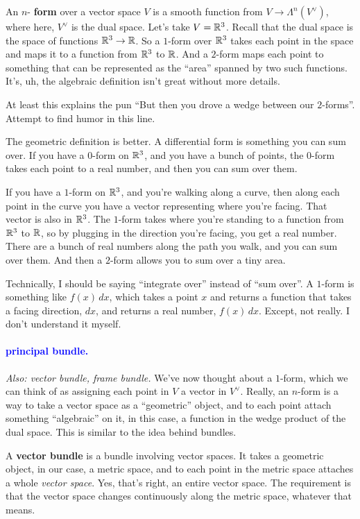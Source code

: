\documentclass[11pt,paper=letter]{scrartcl}
\renewcommand{\bluebf}[1]{{\bfseries \color{Blue} #1}}
\renewcommand\wp[1]{\paragraph{\textcolor{Blue}{#1.}} \hspace{-1em}}
\newcommand\wl[1]{\label{w:#1}}
\newcommand\oww[1]{\textit{Also: #1.}}
\begin{document}
An $n$-\bluebf{form} over a vector space $V$ is a smooth function from $V \to \Lambda^n(V^{\vee})$, where here, $V^{\vee}$ is the dual space. Let's take $V = \mathbb R^3$. Recall that the dual space is the space of functions $\mathbb R^3 \to \mathbb R$. So a $1$-form over $\mathbb R^3$ takes each point in the space and maps it to a function from $\mathbb R^3$ to $\mathbb R$. And a $2$-form maps each point to something that can be represented as the ``area'' spanned by two such functions. It's, uh, the algebraic definition isn't great without more details.

\begin{exrboxed}
  At least this explains the pun ``But then you drove a wedge between our $2$-forms''. Attempt to find humor in this line.
\end{exrboxed}

The geometric definition is better. A differential form is something you can sum over. If you have a $0$-form on $\mathbb R^3$, and you have a bunch of points, the $0$-form takes each point to a real number, and then you can sum over them.

If you have a $1$-form on $\mathbb R^3$, and you're walking along a curve, then along each point in the curve you have a vector representing where you're facing. That vector is also in $\mathbb R^3$. The $1$-form takes where you're standing to a function from $\mathbb R^3$ to $\mathbb R$, so by plugging in the direction you're facing, you get a real number. There are a bunch of real numbers along the path you walk, and you can sum over them. And then a $2$-form allows you to sum over a tiny area.

\begin{remboxed}
  Technically, I should be saying ``integrate over'' instead of ``sum over''. A $1$-form is something like $f(x)\,dx$, which takes a point $x$ and returns a function that takes a facing direction, $dx$, and returns a real number, $f(x)\,dx$. Except, not really. I don't understand it myself.
\end{remboxed}

\wp{principal bundle}
\wl{principal bundle}
\oww{vector bundle, frame bundle}
We've now thought about a $1$-form, which we can think of as assigning each point in $V$ a vector in $V^\vee$. Really, an $n$-form is a way to take a vector space as a ``geometric'' object, and to each point attach something ``algebraic'' on it, in this case, a function in the wedge product of the dual space. This is similar to the idea behind bundles.

A \textbf{vector bundle} is a bundle involving vector spaces. It takes a geometric object, in our case, a metric space, and to each point in the metric space attaches a whole \textit{vector space}. Yes, that's right, an entire vector space. The requirement is that the vector space changes continuously along the metric space, whatever that means.
\end{document}
